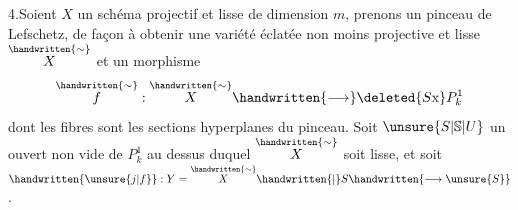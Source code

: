 4.\quad Soient $X$ un schéma projectif et lisse de dimension $m$, prenons un pinceau de Lefschetz, de façon à obtenir une variété éclatée non moins projective et lisse $\overset{\handwritten{\sim}}{X}$ et un morphisme
\[
\overset{\handwritten{\sim}}{f}:\overset{\handwritten{\sim}}{X}\handwritten{\longrightarrow}\deleted{S\mathrm{x}}P^1_k
\]
dont les fibres sont les sections hyperplanes du pinceau. Soit $\unsure{S|\mathbb{S}|U}$ un ouvert non vide de $P^1_k$ au dessus duquel $\overset{\handwritten{\sim}}{X}$ soit lisse, et soit $\handwritten{\unsure{j|f}}:Y=\overset{\handwritten{\sim}}{X}\handwritten{|}S\handwritten{\longrightarrow\unsure{S}}$.

